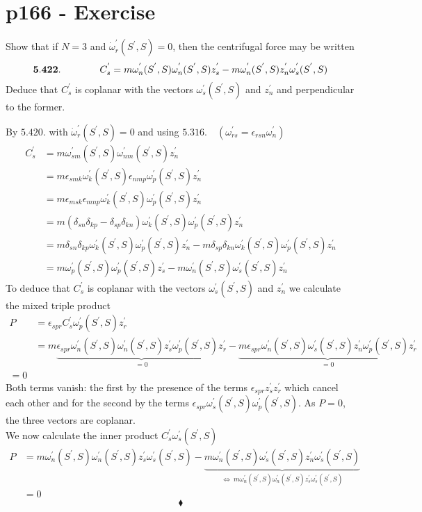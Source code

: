 \section{p166 - Exercise}
\begin{tcolorbox}
Show that if $N=3$ and $\dot{\omega}^{'}_r(S^{'},S) =0$, then the centrifugal force may be written 
$$\mathbf{5.422.}\quad\quad\quad\quad C^{'}_s = m\omega^{'}_{n}(S^{'},S)\omega^{'}_{n}(S^{'},S)z^{'}_s-m\omega^{'}_{n}(S^{'},S)z^{'}_n\omega^{'}_{s}(S^{'},S)$$
Deduce that $ C^{'}_s$ is coplanar with the vectors $\omega^{'}_{s}(S^{'},S)$ and $z^{'}_n$ and perpendicular to the former.
\end{tcolorbox}
By $\mathbf{5.420.}$ with $\dot{\omega}^{'}_r(S^{'},S) =0$ and using $\mathbf{5.316.} \quad ( \omega^{'}_{rs}=\epsilon_{rsn}\omega^{'}_n)$
\begin{align}
C^{'}_s &= m\omega^{'}_{sm}(S^{'},S)\omega^{'}_{nm}(S^{'},S)z^{'}_n\\
&= m\epsilon_{smk}\omega^{'}_k(S^{'},S)\epsilon_{nmp}\omega^{'}_p(S^{'},S)z^{'}_n\\
&= m\epsilon_{msk}\epsilon_{mnp}\omega^{'}_k(S^{'},S)\omega^{'}_p(S^{'},S)z^{'}_n\\
&= m\left(\delta_{sn}\delta_{kp} -\delta_{sp}\delta_{kn} \right)\omega^{'}_k(S^{'},S)\omega^{'}_p(S^{'},S)z^{'}_n\\
&= m\delta_{sn}\delta_{kp}\omega^{'}_k(S^{'},S)\omega^{'}_p(S^{'},S)z^{'}_n -m\delta_{sp}\delta_{kn} \omega^{'}_k(S^{'},S)\omega^{'}_p(S^{'},S)z^{'}_n\\
&= m\omega^{'}_p(S^{'},S)\omega^{'}_p(S^{'},S)z^{'}_s - m\omega^{'}_n(S^{'},S)\omega^{'}_s(S^{'},S)z^{'}_n
\end{align}
To deduce that $ C^{'}_s$ is coplanar with the vectors $\omega^{'}_{s}(S^{'},S)$ and $z^{'}_n$ we calculate the mixed triple product
\begin{align}
P &= \epsilon_{spr}C^{'}_s \omega^{'}_p(S^{'},S)z^{'}_r\\
&= m\underbrace{\epsilon_{spr} \omega^{'}_n(S^{'},S)\omega^{'}_n(S^{'},S)z^{'}_s \omega^{'}_p(S^{'},S)z^{'}_r}_{=0} -\underbrace{ m\epsilon_{spr}\omega^{'}_n(S^{'},S)\omega^{'}_s(S^{'},S)z^{'}_n \omega^{'}_p(S^{'},S)z^{'}_r}_{=0}\\
=0
\end{align}
Both terms vanish: the first by the presence of the terms $\epsilon_{spr}z^{'}_s z^{'}_r$ which cancel each other and for the second by the terms $\epsilon_{spr}\omega^{'}_s(S^{'},S) \omega^{'}_p(S^{'},S)$. As $P=0$, the three vectors are coplanar.\\
We now calculate the inner product $C^{'}_s\omega^{'}_s(S^{'},S)$
\begin{align}
P&= m\omega^{'}_n(S^{'},S)\omega^{'}_n(S^{'},S)z^{'}_s\omega^{'}_s(S^{'},S) - \underbrace{m\omega^{'}_n(S^{'},S)\omega^{'}_s(S^{'},S)z^{'}_n\omega^{'}_s(S^{'},S)}_{\Leftrightarrow \  m\omega^{'}_n(S^{'},S)\omega^{'}_n(S^{'},S)z^{'}_s\omega^{'}_s(S^{'},S)}\\
&=0
\end{align}
$$\blacklozenge$$
\newpage

